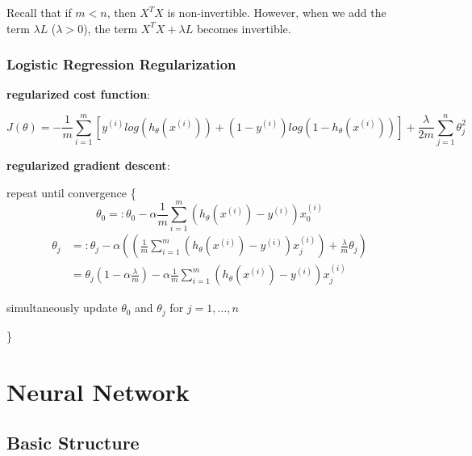 \documentclass{article}
\begin{document}
\bigskip

\noindent Recall that if \(m < n\), then \(X^TX\) is non-invertible. However, when we add the term \(\lambda L\) (\(\lambda > 0\)), the term \(X^TX + \lambda L\) becomes invertible.

\subsubsection{Logistic Regression Regularization}

\noindent \textbf{regularized cost function}:

\[J(\theta) = - \frac{1}{m} \sum_{i = 1}^{m} [y^{(i)} log(h_{\theta} (x^{(i)})) + (1 - y^{(i)}) log(1 - h_{\theta} (x^{(i)}))] + \frac{\lambda}{2m} \sum_{j = 1}^n \theta_j^2\]

\noindent \textbf{regularized gradient descent}:

\noindent repeat until convergence \{
\[\theta_0 =: \theta_0 - \alpha \frac{1}{m} \sum_{i = 1}^m (h_{\theta}(x^{(i)}) - y^{(i)}) x^{(i)}_0\]
\begin{equation*}
\begin{split}
\theta_j & =: \theta_j - \alpha ((\frac{1}{m} \sum_{i = 1}^m (h_{\theta}(x^{(i)}) - y^{(i)}) x^{(i)}_j) + \frac{\lambda}{m} \theta_j) \\
 & = \theta_j (1 - \alpha \frac{\lambda}{m}) - \alpha \frac{1}{m} \sum_{i = 1}^m (h_{\theta}(x^{(i)}) - y^{(i)}) x^{(i)}_j
\end{split}
\end{equation*}

\centerline{simultaneously update \(\theta_0\) and \(\theta_j\) for \(j = 1, \dots, n\)}
\}

\section{Neural Network}

\subsection{Basic Structure}
\end{document}
